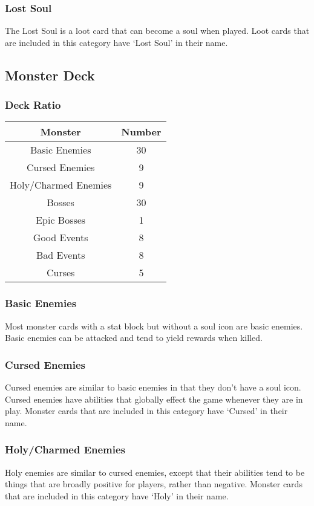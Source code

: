 \documentclass[10pt, a4paper, twoside]{article} %
\begin{document}
    \subsubsection*{Lost Soul}
    The Lost Soul is a loot card that can become a soul when played. Loot cards that are included in this category have ‘Lost Soul’ in their name.

    \subsection{Monster Deck}
    \subsubsection*{Deck Ratio}
    \begin{tabular}{ | c | c | }
        \hline
        \textbf{Monster} & \textbf{Number}\\
        \hline 
        Basic Enemies & 30\\
        Cursed Enemies & 9\\
        Holy/Charmed Enemies & 9\\
        Bosses & 30\\
        Epic Bosses & 1\\
        Good Events & 8\\
        Bad Events & 8\\
        Curses & 5\\
        \hline
    \end{tabular}
    \subsubsection*{Basic Enemies}
    Most monster cards with a stat block but without a soul icon are basic enemies. Basic enemies can be attacked and tend to yield rewards when killed.
    \subsubsection*{Cursed Enemies}
    Cursed enemies are similar to basic enemies in that they don’t have a soul icon. Cursed enemies have abilities that globally effect the game whenever they are in play. Monster cards that are included in this category have ‘Cursed’ in their name.
    \subsubsection*{Holy/Charmed Enemies}
    Holy enemies are similar to cursed enemies, except that their abilities tend to be things that are broadly positive for players, rather than negative. Monster cards that are included in this category have ‘Holy’ in their name.
    
\end{document}
